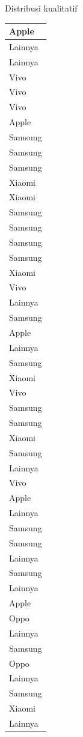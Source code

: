 \documentclass[
  ignorenonframetext,
]{beamer}
\begin{document}
\begin{frame}[s]{Distribusi kualitatif}
\begin{table}
\begin{tabular}[t]{l}
\hline
Apple\\
\hline
Lainnya\\
\hline
Lainnya\\
\hline
Vivo\\
\hline
Vivo\\
\hline
Vivo\\
\hline
Apple\\
\hline
Samsung\\
\hline
Samsung\\
\hline
Samsung\\
\hline
Xiaomi\\
\hline
Xiaomi\\
\hline
Samsung\\
\hline
Samsung\\
\hline
Samsung\\
\hline
Samsung\\
\hline
Xiaomi\\
\hline
Vivo\\
\hline
Lainnya\\
\hline
Samsung\\
\hline
Apple\\
\hline
Lainnya\\
\hline
Samsung\\
\hline
Xiaomi\\
\hline
Vivo\\
\hline
Samsung\\
\hline
Samsung\\
\hline
Xiaomi\\
\hline
Samsung\\
\hline
Lainnya\\
\hline
Vivo\\
\hline
Apple\\
\hline
Lainnya\\
\hline
Samsung\\
\hline
Samsung\\
\hline
Lainnya\\
\hline
Samsung\\
\hline
Lainnya\\
\hline
Apple\\
\hline
Oppo\\
\hline
Lainnya\\
\hline
Samsung\\
\hline
Oppo\\
\hline
Lainnya\\
\hline
Samsung\\
\hline
Xiaomi\\
\hline
Lainnya\\

\end{tabular}
\end{table}
\end{frame}
\end{document}
